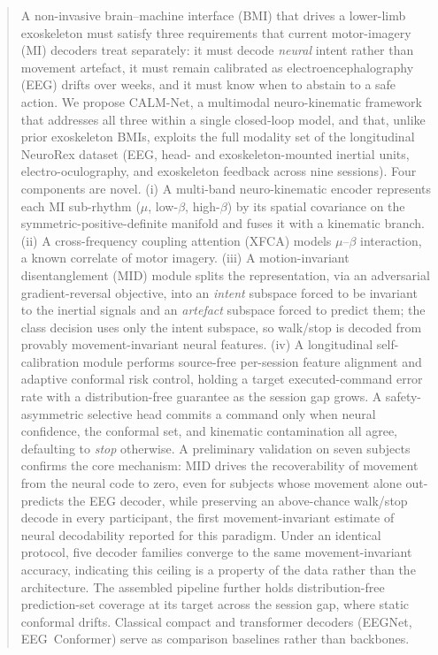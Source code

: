 \documentclass[journal]{IEEEtran}
\begin{document}
\begin{abstract}
A non-invasive brain--machine interface (BMI) that drives a lower-limb exoskeleton
must satisfy three requirements that current motor-imagery (MI) decoders treat
separately: it must decode \emph{neural} intent rather than movement artefact, it
must remain calibrated as electroencephalography (EEG) drifts over weeks, and it
must know when to abstain to a safe action. We propose CALM-Net, a multimodal
neuro-kinematic framework that addresses all three within a single closed-loop
model, and that, unlike prior exoskeleton BMIs, exploits the full modality set of
the longitudinal NeuroRex dataset (EEG, head- and exoskeleton-mounted inertial
units, electro-oculography, and exoskeleton feedback across nine sessions). Four
components are novel. (i) A multi-band neuro-kinematic encoder represents each MI
sub-rhythm ($\mu$, low-$\beta$, high-$\beta$) by its spatial covariance on the
symmetric-positive-definite manifold and fuses it with a kinematic branch. (ii) A
cross-frequency coupling attention (XFCA) models $\mu$--$\beta$ interaction, a known
correlate of motor imagery. (iii) A motion-invariant disentanglement (MID) module
splits the representation, via an adversarial gradient-reversal objective, into an
\emph{intent} subspace forced to be invariant to the inertial signals and an
\emph{artefact} subspace forced to predict them; the class decision uses only the
intent subspace, so walk/stop is decoded from provably movement-invariant neural
features. (iv) A longitudinal self-calibration module performs source-free
per-session feature alignment and adaptive conformal risk control, holding a target
executed-command error rate with a distribution-free guarantee as the session gap
grows. A safety-asymmetric selective head commits a command only when neural
confidence, the conformal set, and kinematic contamination all agree, defaulting to
\emph{stop} otherwise. A preliminary validation on seven subjects confirms the core
mechanism: MID drives the recoverability of movement from the neural code to zero,
even for subjects whose movement alone out-predicts the EEG decoder, while
preserving an above-chance walk/stop decode in every participant, the first
movement-invariant estimate of neural decodability reported for this paradigm. Under
an identical protocol, five decoder families converge to the same movement-invariant
accuracy, indicating this ceiling is a property of the data rather than the
architecture. The
assembled pipeline further holds distribution-free prediction-set coverage at its
target across the session gap, where static conformal drifts. Classical compact and
transformer decoders (EEGNet, EEG~Conformer) serve as comparison baselines rather
than backbones.
\end{abstract}
\end{document}
